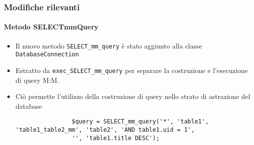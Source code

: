 \begin{frame}[fragile]
	\frametitle{Modifiche rilevanti}
	\framesubtitle{Metodo SELECTmmQuery}

	\lstset{basicstyle=\tiny\ttfamily}

	\begin{itemize}

		\item Il nuovo metodo \texttt{SELECT\_mm\_query} è stato aggiunto alla classe \texttt{DatabaseConnection}

		\item Estratto da \texttt{exec\_SELECT\_mm\_query} per separare la costruzione e l'esecuzione
			di query M:M.

		\item Ciò permette l'utilizzo della costruzione di query nello strato di astrazione del database

			\begin{lstlisting}
				$query = SELECT_mm_query('*', 'table1', 'table1_table2_mm', 'table2', 'AND table1.uid = 1',
				'', 'table1.title DESC');
			\end{lstlisting}

	\end{itemize}

\end{frame}


